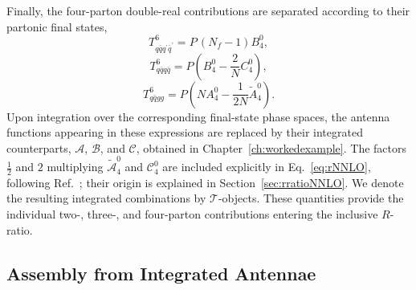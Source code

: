 Finally, the four-parton double-real contributions are separated according to their partonic final
states,
\begin{equation}
    T_{q\bar qq^\prime\bar q^\prime}^6 = P\,(N_f-1)B_4^0,
\end{equation}
\begin{equation}
    T_{q\bar qq\bar q}^6 = P\left(B_4^0-\frac2N C_4^0\right),
\end{equation}
\begin{equation}
    T_{q\bar qgg}^6 = P\left(NA_4^0-\frac1{2N}\tilde A_4^0\right).
\end{equation}
Upon integration over the corresponding final-state phase spaces, the antenna functions appearing in
these expressions are replaced by their integrated counterparts, $\mathcal A$, $\mathcal B$, and
$\mathcal C$, obtained in Chapter~\ref{ch:workedexample}. The factors $\tfrac12$ and $2$ multiplying $\tilde{\mathcal A}_4^0$ and $\mathcal C_4^0$ are included explicitly in Eq.~\eqref{eq:rNNLO}, following Ref.~\cite{Gehrmann-DeRidder:2004ttg}; their origin is explained in Section~\ref{sec:rratioNNLO}. We
denote the resulting integrated combinations by $\mathcal T$-objects. These quantities provide the individual two-, three-, and
four-parton contributions entering the inclusive $R$-ratio.

\iffalse

\subsection{Assembly from Integrated Antennae}\label{subsec:Tobjects}

